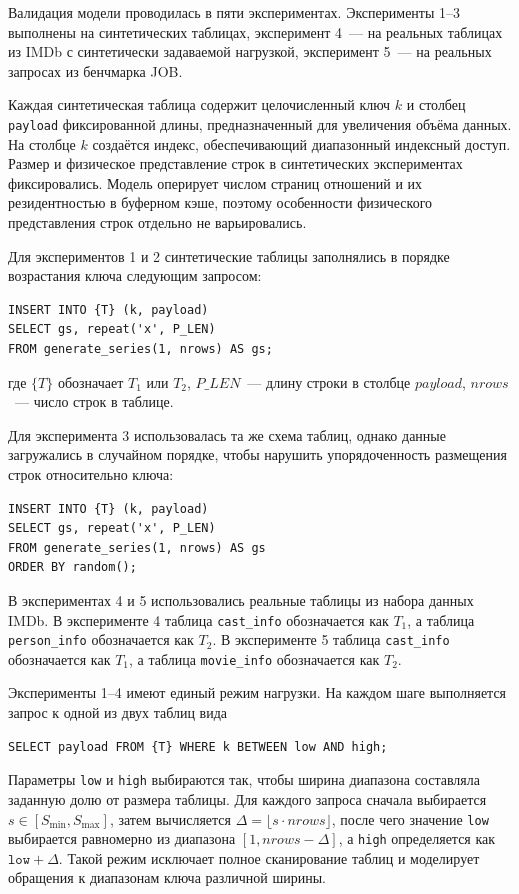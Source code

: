 Валидация модели проводилась в пяти экспериментах. Эксперименты 1--3 выполнены на синтетических таблицах, эксперимент 4~--- на реальных таблицах из IMDb с синтетически задаваемой нагрузкой, эксперимент 5~--- на реальных запросах из бенчмарка JOB.

Каждая синтетическая таблица содержит целочисленный ключ \(k\) и столбец \texttt{payload} фиксированной длины, предназначенный для увеличения объёма данных. На столбце \(k\) создаётся индекс, обеспечивающий диапазонный индексный доступ. Размер и физическое представление строк в синтетических экспериментах фиксировались. Модель оперирует числом страниц отношений и их резидентностью в буферном кэше, поэтому особенности физического представления строк отдельно не варьировались.

Для экспериментов 1 и 2 синтетические таблицы заполнялись в порядке возрастания ключа следующим запросом:
\begin{verbatim}
INSERT INTO {T} (k, payload)
SELECT gs, repeat('x', P_LEN)
FROM generate_series(1, nrows) AS gs;
\end{verbatim}
где \(\{T\}\) обозначает \(T_1\) или \(T_2\), \(P\_LEN\)~--- длину строки в столбце \(payload\), \(nrows\)~--- число строк в таблице.

Для эксперимента 3 использовалась та же схема таблиц, однако данные загружались в случайном порядке, чтобы нарушить упорядоченность размещения строк относительно ключа:
\begin{verbatim}
INSERT INTO {T} (k, payload)
SELECT gs, repeat('x', P_LEN)
FROM generate_series(1, nrows) AS gs
ORDER BY random();
\end{verbatim}

В экспериментах 4 и 5 использовались реальные таблицы из набора данных IMDb. В эксперименте 4 таблица \texttt{cast\_info} обозначается как \(T_1\), а таблица \texttt{person\_info} обозначается как \(T_2\). В эксперименте 5 таблица \texttt{cast\_info} обозначается как \(T_1\), а таблица \texttt{movie\_info} обозначается как \(T_2\).

Эксперименты 1--4 имеют единый режим нагрузки. На каждом шаге выполняется запрос к одной из двух таблиц вида
\begin{verbatim}
SELECT payload FROM {T} WHERE k BETWEEN low AND high;
\end{verbatim}
Параметры \texttt{low} и \texttt{high} выбираются так, чтобы ширина диапазона составляла заданную долю от размера таблицы. Для каждого запроса сначала выбирается \(s \in [S_{\min}, S_{\max}]\), затем вычисляется \(\Delta = \lfloor s \cdot nrows \rfloor\), после чего значение \texttt{low} выбирается равномерно из диапазона \([1, nrows - \Delta]\), а \texttt{high} определяется как \(\texttt{low} + \Delta\). Такой режим исключает полное сканирование таблиц и моделирует обращения к диапазонам ключа различной ширины.


